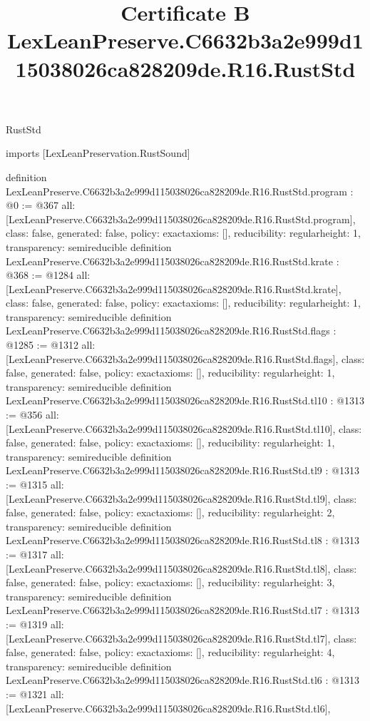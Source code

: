 \begin{lexlean}{RustStd}
\title{Certificate B LexLeanPreserve.C6632b3a2e999d115038026ca828209de.R16.RustStd}
\begin{coremodule}
imports [LexLeanPreservation.RustSound]

definition LexLeanPreserve.C6632b3a2e999d115038026ca828209de.R16.RustStd.program : @0 := @367 {
  all: [LexLeanPreserve.C6632b3a2e999d115038026ca828209de.R16.RustStd.program],
  class: false,
  generated: false,
  policy: exact{axioms: []},
  reducibility: regular{height: 1},
  transparency: semireducible
}
definition LexLeanPreserve.C6632b3a2e999d115038026ca828209de.R16.RustStd.krate : @368 := @1284 {
  all: [LexLeanPreserve.C6632b3a2e999d115038026ca828209de.R16.RustStd.krate],
  class: false,
  generated: false,
  policy: exact{axioms: []},
  reducibility: regular{height: 1},
  transparency: semireducible
}
definition LexLeanPreserve.C6632b3a2e999d115038026ca828209de.R16.RustStd.flags : @1285 := @1312 {
  all: [LexLeanPreserve.C6632b3a2e999d115038026ca828209de.R16.RustStd.flags],
  class: false,
  generated: false,
  policy: exact{axioms: []},
  reducibility: regular{height: 1},
  transparency: semireducible
}
definition LexLeanPreserve.C6632b3a2e999d115038026ca828209de.R16.RustStd.tl10 : @1313 := @356 {
  all: [LexLeanPreserve.C6632b3a2e999d115038026ca828209de.R16.RustStd.tl10],
  class: false,
  generated: false,
  policy: exact{axioms: []},
  reducibility: regular{height: 1},
  transparency: semireducible
}
definition LexLeanPreserve.C6632b3a2e999d115038026ca828209de.R16.RustStd.tl9 : @1313 := @1315 {
  all: [LexLeanPreserve.C6632b3a2e999d115038026ca828209de.R16.RustStd.tl9],
  class: false,
  generated: false,
  policy: exact{axioms: []},
  reducibility: regular{height: 2},
  transparency: semireducible
}
definition LexLeanPreserve.C6632b3a2e999d115038026ca828209de.R16.RustStd.tl8 : @1313 := @1317 {
  all: [LexLeanPreserve.C6632b3a2e999d115038026ca828209de.R16.RustStd.tl8],
  class: false,
  generated: false,
  policy: exact{axioms: []},
  reducibility: regular{height: 3},
  transparency: semireducible
}
definition LexLeanPreserve.C6632b3a2e999d115038026ca828209de.R16.RustStd.tl7 : @1313 := @1319 {
  all: [LexLeanPreserve.C6632b3a2e999d115038026ca828209de.R16.RustStd.tl7],
  class: false,
  generated: false,
  policy: exact{axioms: []},
  reducibility: regular{height: 4},
  transparency: semireducible
}
definition LexLeanPreserve.C6632b3a2e999d115038026ca828209de.R16.RustStd.tl6 : @1313 := @1321 {
  all: [LexLeanPreserve.C6632b3a2e999d115038026ca828209de.R16.RustStd.tl6],
}
\end{coremodule}
\end{lexlean}
